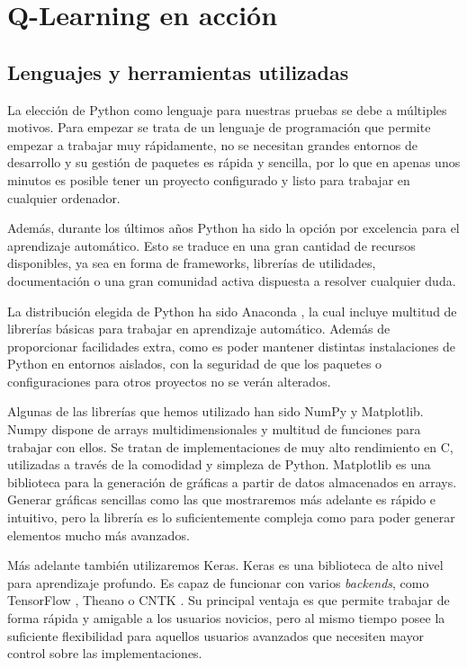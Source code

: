 \chapter{Q-Learning en acción}
\label{cap:q-learning}



\section{Lenguajes y herramientas utilizadas}

La elección de Python \citep{python} como lenguaje para nuestras pruebas se debe a múltiples motivos. Para empezar se trata de un lenguaje de programación que permite empezar a trabajar muy rápidamente, no se necesitan grandes entornos de desarrollo y su gestión de paquetes es rápida y sencilla, por lo que en apenas unos minutos es posible tener un proyecto configurado y listo para trabajar en cualquier ordenador.

Además, durante los últimos años Python ha sido la opción por excelencia para el aprendizaje automático. Esto se traduce en una gran cantidad de recursos disponibles, ya sea en forma de frameworks, librerías de utilidades, documentación o una gran comunidad activa dispuesta a resolver cualquier duda.

La distribución elegida de Python ha sido Anaconda \citep{anaconda}, la cual incluye multitud de librerías básicas para trabajar en aprendizaje automático. Además de proporcionar facilidades extra, como es poder mantener distintas instalaciones de Python en entornos aislados, con la seguridad de que los paquetes o configuraciones para otros proyectos no se verán alterados.

Algunas de las librerías que hemos utilizado han sido NumPy y Matplotlib. Numpy \citep{numpy} dispone de arrays multidimensionales y multitud de funciones para trabajar con ellos. Se tratan de implementaciones de muy alto rendimiento en C, utilizadas a través de la comodidad y simpleza de Python. Matplotlib \citep{matplotlib} es una biblioteca para la generación de gráficas a partir de datos almacenados en arrays. Generar gráficas sencillas como las que mostraremos más adelante es rápido e intuitivo, pero la librería es lo suficientemente compleja como para poder generar elementos mucho más avanzados.

Más adelante también utilizaremos Keras. Keras \citep{chollet2015keras} es una biblioteca de alto nivel para aprendizaje profundo. Es capaz de funcionar con varios \textit{backends}, como TensorFlow \citep{tensorflow2015-whitepaper}, Theano \citep{2016arXiv160502688short} o CNTK \citep{Seide:2016:CMO:2939672.2945397}. Su principal ventaja es que permite trabajar de forma rápida y amigable a los usuarios novicios, pero al mismo tiempo posee la suficiente flexibilidad para aquellos usuarios avanzados que necesiten mayor control sobre las implementaciones.


